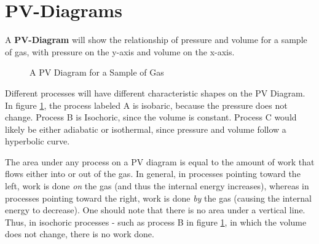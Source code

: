 	\newpage
	
	\section{PV-Diagrams} 
	A \textbf{PV-Diagram} will show the relationship of pressure and volume for a sample of gas, with pressure on the y-axis and volume on the x-axis.  

\begin{figure}[h]
		\caption{A PV Diagram for a Sample of Gas} \label{figure:pv1}
	\centering

\end{figure}
	
Different processes will have different characteristic shapes on the PV Diagram.  In figure \ref{figure:pv1}, the process labeled A is isobaric, because the pressure does not change.  Process B is Isochoric, since the volume is constant.  Process C would likely be either adiabatic or isothermal, since pressure and volume follow a hyperbolic curve.


The area under any process on a PV diagram is equal to the amount of work that flows either into or out of the gas.  In general, in processes pointing toward the left, work is done \textit{on} the gas (and thus the internal energy increases), whereas in processes pointing toward the right, work is done \textit{by} the gas (causing the internal energy to decrease). One should note that there is no area under a vertical line.  Thus, in isochoric processes - such as process B in figure \ref{figure:pv1}, in which the volume does not change, there is no work done. 

